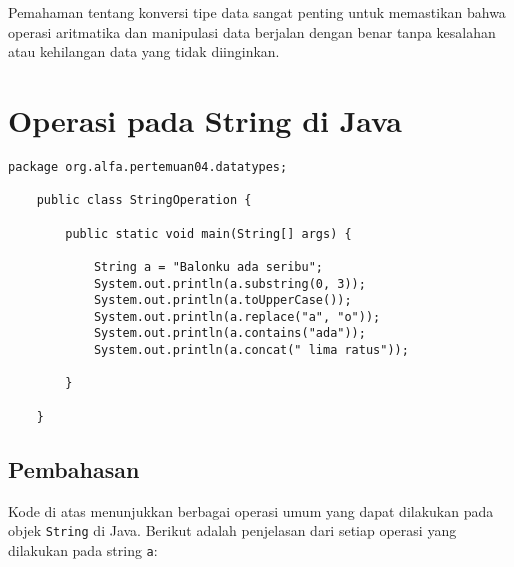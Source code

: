 Pemahaman tentang konversi tipe data sangat penting untuk memastikan bahwa operasi aritmatika dan manipulasi data berjalan dengan benar tanpa kesalahan atau kehilangan data yang tidak diinginkan.


\section{Operasi pada String di Java}

\begin{lstlisting}[style=JavaStyle, caption={Java Code for String Operations}]
	package org.alfa.pertemuan04.datatypes;
	
	public class StringOperation {
		
		public static void main(String[] args) {
			
			String a = "Balonku ada seribu";
			System.out.println(a.substring(0, 3));
			System.out.println(a.toUpperCase());
			System.out.println(a.replace("a", "o"));
			System.out.println(a.contains("ada"));
			System.out.println(a.concat(" lima ratus"));
			
		}
		
	}
\end{lstlisting}

\subsection{Pembahasan}
Kode di atas menunjukkan berbagai operasi umum yang dapat dilakukan pada objek \texttt{String} di Java. Berikut adalah penjelasan dari setiap operasi yang dilakukan pada string \texttt{a}:

